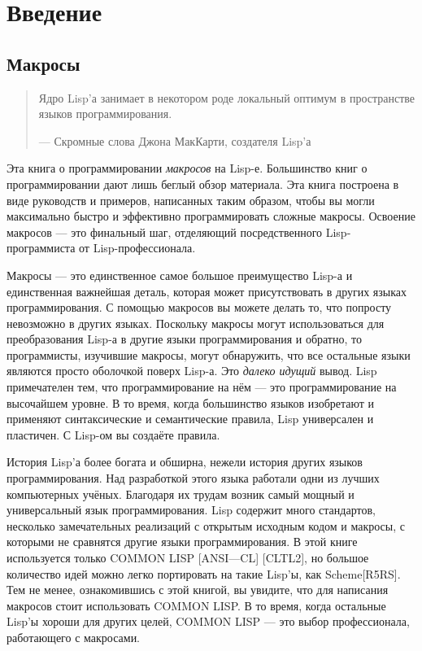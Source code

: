 \chapter{Введение}\label{chapter_introduction}
\section{Макросы}\label{section_macros}
\begin{quote}
Ядро Lisp'а занимает в некотором роде локальный оптимум в пространстве языков программирования.

--- Скромные слова Джона МакКарти, создателя Lisp'а
\end{quote}
Эта книга о программировании \emph{макросов} на Lisp-е. Большинство книг о программировании дают лишь беглый обзор материала. Эта книга построена в виде руководств и примеров, написанных таким образом, чтобы вы могли максимально быстро и эффективно программировать сложные макросы. Освоение макросов --- это фи\-наль\-ный шаг, от\-де\-ля\-ющий посредственного Lisp-программиста от Lisp-профессионала.

Макросы --- это единственное самое большое преимущество Lisp-а и единственная важнейшая деталь, которая может присутствовать в дру\-гих языках программирования. С помощью макросов вы можете делать то, что попросту невозможно в других языках. Поскольку макросы могут использоваться для преобразования Lisp-а в другие языки про\-грам\-ми\-ро\-ва\-ния и обратно, то программисты, изучившие макросы, могут обнаружить, что все остальные языки являются просто оболочкой по\-верх Lisp-а. Это \emph{далеко идущий} вывод. Lisp примечателен тем, что программирование на нём --- это программирование на высочайшем уро\-вне. В то время, когда большинство языков изобретают и применяют синтаксические и семантические правила, Lisp универсален и пластичен. С Lisp-ом вы создаёте правила.

История Lisp'а более богата и обширна, нежели история дру\-гих язы\-ков программирования. Над разработкой этого языка работали одни из лучших компьютерных учёных. Благодаря их трудам возник самый мощный и универсальный язык программирования. Lisp содержит много стандартов, несколько замечательных реализаций с открытым исходным кодом и макросы, с которыми не сравнятся другие языки про\-грам\-ми\-ро\-ва\-ния. В этой книге используется только COMMON LISP [ANSI—CL] [CLTL2], но большое количество идей можно легко портировать на такие Lisp'ы, как Scheme[R5RS]. Тем не менее, ознакомившись с этой книгой, вы увидите, что для написания макросов стоит использовать COMMON LISP. В то время, когда остальные Lisp'ы хороши для других целей, COMMON LISP --- это выбор профессионала, работающего с макросами.

